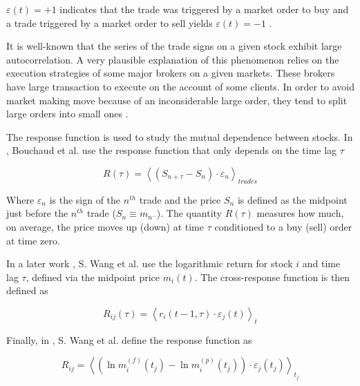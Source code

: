 $\varepsilon(t) = +1$ indicates that the trade was triggered by a market order
to buy and a trade triggered by a market order to sell yields
$\varepsilon(t) = -1$
\cite{quant_stock_price_response,Bouchaud_2004,subtle_nature,order_flow_persistent,spread_changes_affect}.

It is well-known that the series of the trade signs on a given stock exhibit
large autocorrelation. A very plausible explanation of this phenomenon relies
on the execution strategies of some major brokers on a given markets. These
brokers have large transaction to execute on the account of some clients. In
order to avoid market making move because of an inconsiderable large order,
they tend to split large orders into small ones \cite{empirical_facts}.

The response function is used to study the mutual dependence between stocks. In
\cite{Bouchaud_2004,r_walks_liquidity}, Bouchaud et al. use the response function that only
depends on the time lag $\tau$

\begin{equation}\label{eq:Bouchaud_2004}
    R\left(\tau\right)=\left\langle \left(S_{n+\tau}-S_{n}\right) \cdot
    \varepsilon_{n}\right\rangle_{trades}
\end{equation}

Where $\varepsilon_{n}$ is the sign of the $n^{th}$ trade and the price $S_n$
is defined as the midpoint just before the $n^{th}$ trade
($S_{n} \equiv m_{n^{-}}$).
The quantity $R\left(\tau\right)$ measures how much, on average, the price
moves up (down) at time $\tau$ conditioned to a buy (sell) order at time zero.

In a later work \cite{Wang_2016_cross}, S. Wang et al. use the logarithmic
return for stock $i$ and time lag $\tau$, defined via the midpoint price
$m_{i} \left( t \right)$. The cross-response function is then defined as

\begin{equation}\label{eq:Wang_2016}
    R_{ij}\left(\tau\right)=\left\langle r_{i}\left(t-1,\tau\right)\cdot
    \varepsilon_{j} \left(t\right) \right\rangle _{t}
\end{equation}

Finally, in \cite{Wang_2018_b}, S. Wang et al. define the response function as

\begin{equation}\label{eq:Wang_2018_b}
    R_{ij} = \left\langle \left(\ln m_{i}^{\left(f\right)}\left(t_{j}\right)-
    \ln m_{i}^{\left(p\right)} \left(t_{j}\right) \right)\cdot\varepsilon_{j}
    \left(t_{j}\right)\right\rangle _{t_{j}}
\end{equation}

